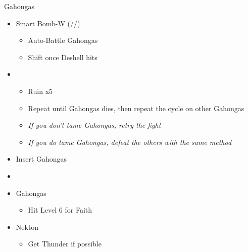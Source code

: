 \renewcommand{\third}{[3] Smart Bomb-W (\rav/\sab/\nek)}
\begin{battle}{Gahongas}
  \begin{itemize}
    \item \third
          \begin{itemize}
            \item Auto-Battle Gahongas
            \item Shift once Deshell hits
          \end{itemize}
    \item \first
          \begin{itemize}
            \item Ruin x5
            \item Repeat until Gahongas dies, then repeat the cycle on other Gahongas
            \item \textit{If you don't tame Gahongas, retry the fight}
            \item \textit{If you do tame Gahongas, defeat the others with the same method}
          \end{itemize}
  \end{itemize}
\end{battle}

\begin{menu}
  \begin{itemize}
    \paradigm
    \begin{itemize}
      \item Insert Gahongas
      \item {}%
            {\paradigmline{\com}{\com}{\nek}{\X}}%
            {\paradigmline{(\rav)}{(\rav)}{(\gah)}{\W}}%
            {\paradigmline{\rav}{\sab}{\nek}{\W}}%
            {\paradigmline{\sen}{\sen}{\nek}{\W}}%
            {\paradigmline{\rav}{\rav}{\nek}{\W}}%
            {\paradigmline[6]{\textit{\rav}}{\textit{\rav}}{\textit{\nek}}{\textit{\W}}}
    \end{itemize}
    \crystarium
    \begin{itemize}
      \item Gahongas
            \begin{itemize}
              \item Hit Level 6 for Faith
            \end{itemize}
      \item Nekton
            \begin{itemize}
              \item Get Thunder if possible
            \end{itemize}
    \end{itemize}
  \end{itemize}
\end{menu}